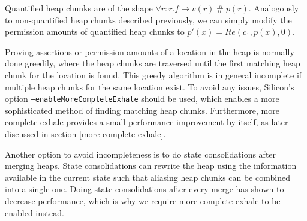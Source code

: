 \documentclass[11pt]{article}
\DeclareMathOperator{\perm}{\mathbin{\#}}
\begin{document}
    Quantified heap chunks are of the shape
    $\forall r: r.f \mapsto v(r) \perm p(r)$.
    Analogously to non-quantified heap chunks described previously,
    we can simply modify the permission amounts of
    quantified heap chunks to $p'(x) = Ite(c_1, p(x), 0)$.
    

    Proving assertions or permission amounts of a location in the heap
    is normally done greedily, where the heap chunks are
    traversed until the first matching heap chunk for the location is found.
    This greedy algorithm is in general incomplete if multiple heap chunks for the same location
    exist. To avoid any issues,
    Silicon's option \texttt{--enableMoreCompleteExhale} should be used,
    which enables a more sophisticated method of finding matching heap chunks.
    Furthermore, more complete exhale provides a small performance improvement
    by itself, as later discussed in section \ref{more-complete-exhale}.

    Another option to avoid incompleteness is to do state consolidations
    after merging heaps. State consolidations can rewrite the heap using the information
    available in the current state such that aliasing heap chunks can be combined into a single one.
    Doing state consolidations after every merge has shown to decrease performance, which is why
    we require more complete exhale to be enabled instead.


\end{document}
